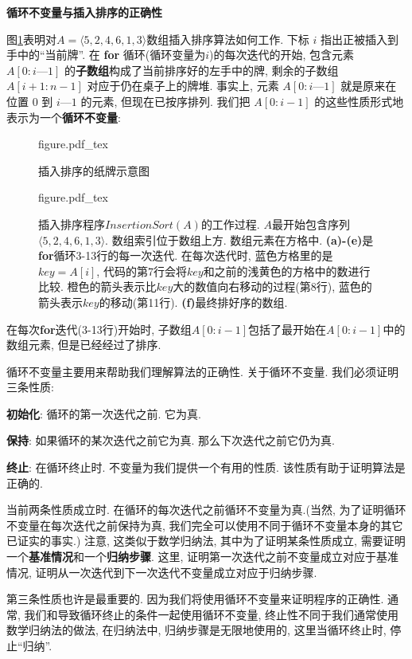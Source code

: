 \documentclass[oneside,10pt,fontset=none]{ctexbook}
\numberwithin{definition}{chapter}
\numberwithin{theorem}{chapter}
\numberwithin{lemma}{chapter}
\begin{document}
\textbf{循环不变量与插入排序的正确性}

图\ref{fig:插入排序完整过程示意图}表明对$A=\langle 5, 2, 4, 6, 1, 3\rangle$数组插入排序算法如何工作. 下标 $i$ 指出正被插入到手中的``当前牌''. 在 \textbf{for} 循环(循环变量为$i$)的每次迭代的开始, 包含元素 $A[0:i—1]$ 的\textbf{子数组}构成了当前排序好的左手中的牌, 剩余的子数组 $A[i+1:n-1]$ 对应于仍在桌子上的牌堆. 事实上, 元素 $A[0:i—1]$ 就是原来在位置 $0$ 到 $i—1$ 的元素, 但现在已按序排列. 我们把 $A[0:i-1]$ 的这些性质形式地表示为一个\textbf{循环不变量}:

\begin{figure}[htbp]
    \def\svgwidth{\columnwidth}
    {figure.pdf_tex}
    \caption{插入排序的纸牌示意图}
\end{figure}

\begin{figure}[htbp]
    \def\svgwidth{\columnwidth}
    {figure.pdf_tex}
    \caption{插入排序程序$InsertionSort(A)$的工作过程. $A$最开始包含序列$\langle 5,2,4,6,1,3 \rangle$. 数组索引位于数组上方. 数组元素在方格中. \textbf{(a)-(e)}是\textbf{for}循环3-13行的每一次迭代. 在每次迭代时, 蓝色方格里的是$key=A[i]$, 代码的第7行会将$key$和之前的浅黄色的方格中的数进行比较. 橙色的箭头表示比$key$大的数值向右移动的过程(第8行), 蓝色的箭头表示$key$的移动(第11行). \textbf{(f)}最终排好序的数组.}
    \label{fig:插入排序完整过程示意图}
\end{figure}

在每次\textbf{for}迭代(3-13行)开始时, 子数组$A[0:i-1]$包括了最开始在$A[0:i-1]$中的数组元素, 但是已经经过了排序.

循环不变量主要用来帮助我们理解算法的正确性. 关于循环不变量. 我们必须证明三条性质:

\textbf{初始化}: 循环的第一次迭代之前. 它为真.

\textbf{保持}: 如果循环的某次迭代之前它为真. 那么下次迭代之前它仍为真.

\textbf{终止}: 在循环终止时. 不变量为我们提供一个有用的性质. 该性质有助于证明算法是正确的.

当前两条性质成立时. 在循环的每次迭代之前循环不变量为真.(当然, 为了证明循环不变量在每次迭代之前保持为真, 我们完全可以使用不同于循环不变量本身的其它已证实的事实.) 注意, 这类似于数学归纳法, 其中为了证明某条性质成立, 需要证明一个\textbf{基准情况}和一个\textbf{归纳步骤}. 这里, 证明第一次迭代之前不变量成立对应于基准情况, 证明从一次迭代到下一次迭代不变量成立对应于归纳步骤.

第三条性质也许是最重要的. 因为我们将使用循环不变量来证明程序的正确性. 通常, 我们和导致循环终止的条件一起使用循环不变量, 终止性不同于我们通常使用数学归纳法的做法, 在归纳法中, 归纳步骤是无限地使用的, 这里当循环终止时, 停止``归纳''.
\end{document}
